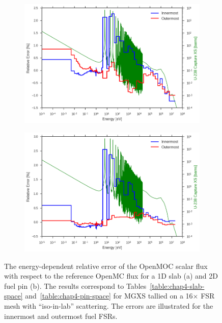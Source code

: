 \begin{figure}[H]
\begin{subfigure}{.9\textwidth}
  \centering
  \includegraphics[width=\linewidth]{figures/biases/slab/rel-err-inner-outer}
  \caption{}
\end{subfigure}
\begin{subfigure}{.9\textwidth}
  \centering
  \includegraphics[width=\linewidth]{figures/biases/pin-cell/rel-err-inner-outer}
  \caption{}
\end{subfigure}
\caption[Flux relative error by energy group]{The energy-dependent relative error of the OpenMOC scalar flux with respect to the reference OpenMC flux for a 1D slab (a) and 2D fuel pin (b). The results correspond to Tables~\ref{table:chap4-slab-space} and~\ref{table:chap4-pin-space} for \ac{MGXS} tallied on a 16$\times$ \ac{FSR} mesh with ``iso-in-lab'' scattering. The errors are illustrated for the innermost and outermost fuel \ac{FSR}s.}
\label{fig:chap4-rel-err-energy}
\end{figure}

